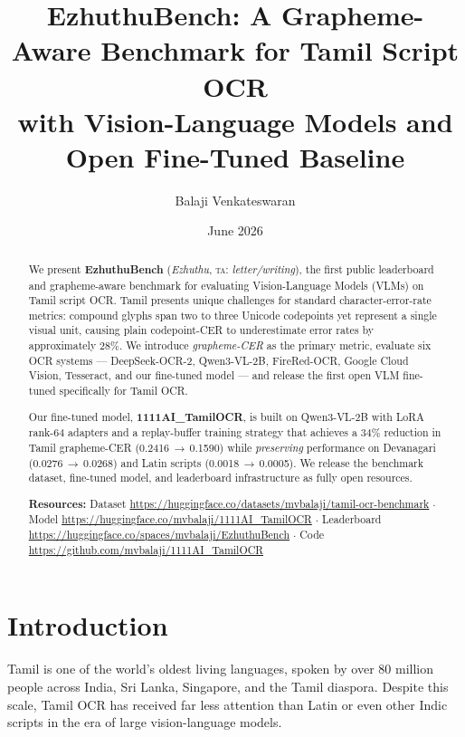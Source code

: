 \documentclass[11pt,a4paper]{article}
\title{\textbf{EzhuthuBench: A Grapheme-Aware Benchmark for Tamil Script OCR\\
with Vision-Language Models and Open Fine-Tuned Baseline}}
\author[1]{Balaji Venkateswaran}
\affil[1]{1111AI, \texttt{balaji.venkateswaran@gmail.com}}
\date{June 2026}
\begin{document}
\maketitle

\begin{abstract}
We present \textbf{EzhuthuBench} (\textit{Ezhuthu}, \textsc{ta}: \textit{letter/writing}),
the first public leaderboard and grapheme-aware benchmark for evaluating
Vision-Language Models (VLMs) on Tamil script OCR.
Tamil presents unique challenges for standard character-error-rate metrics:
compound glyphs span two to three Unicode codepoints yet represent a single
visual unit, causing plain codepoint-CER to underestimate error rates by
approximately 28\%.
We introduce \emph{grapheme-CER} as the primary metric,
evaluate six OCR systems --- DeepSeek-OCR-2, Qwen3-VL-2B, FireRed-OCR,
Google Cloud Vision, Tesseract, and our fine-tuned model ---
and release the first open VLM fine-tuned specifically for Tamil OCR.

Our fine-tuned model, \textbf{1111AI\_TamilOCR}, is built on Qwen3-VL-2B
with LoRA rank-64 adapters and a replay-buffer training strategy that
achieves a 34\% reduction in Tamil grapheme-CER (0.2416\,$\to$\,0.1590)
while \emph{preserving} performance on Devanagari (0.0276\,$\to$\,0.0268)
and Latin scripts (0.0018\,$\to$\,0.0005).
We release the benchmark dataset, fine-tuned model, and leaderboard
infrastructure as fully open resources.

\bigskip
\noindent\textbf{Resources:} Dataset \url{https://huggingface.co/datasets/mvbalaji/tamil-ocr-benchmark}
$\cdot$ Model \url{https://huggingface.co/mvbalaji/1111AI_TamilOCR}
$\cdot$ Leaderboard \url{https://huggingface.co/spaces/mvbalaji/EzhuthuBench}
$\cdot$ Code \url{https://github.com/mvbalaji/1111AI_TamilOCR}
\end{abstract}

\section{Introduction}

Tamil is one of the world's oldest living languages, spoken by over 80 million
people across India, Sri Lanka, Singapore, and the Tamil diaspora.
Despite this scale, Tamil OCR has received far less attention than Latin or
even other Indic scripts in the era of large vision-language models.
\end{document}
